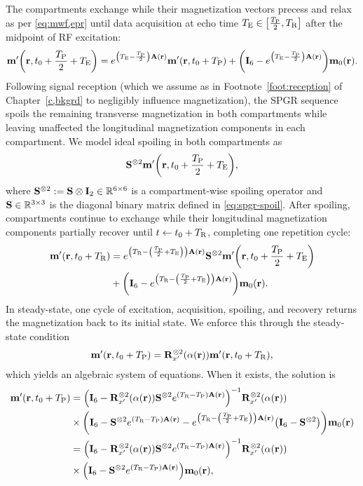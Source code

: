The compartments exchange
while their magnetization vectors precess and relax
as per \eqref{eq:mwf,epr}
until data acquisition
at echo time $\TE \in \brac{\frac{\TP}{2},\TR}$
after the midpoint of RF excitation:
\begin{align}
	\bmmp\paren{\bmr,t_0+\frac{\TP}{2}+\TE} =
		e^{\paren{\TE-\frac{\TP}{2}}\bmA\pr} \bmmp\paren{\bmr,t_0+\TP} 
		+ \paren{\eye{6} - e^{\paren{\TE-\frac{\TP}{2}}\bmA\pr}} \bmmzero\pr.
	\label{eq:mwf,spgr-daq}
\end{align}
Following signal reception
(which we assume 
as in Footnote~\ref{foot:reception} 
of Chapter~\ref{c,bkgrd}
to negligibly influence magnetization),
the SPGR sequence spoils
the remaining transverse magnetization
in both compartments
while leaving unaffected 
the longitudinal magnetization components
in each compartment.
We model ideal spoiling 
in both compartments as 
\begin{align}
	\bmSsix \bmmp\paren{\bmr,t_0+\frac{\TP}{2}+\TE},
	\label{eq:mwf,spgr-spoil}
\end{align}
where $\mathbf{S}^{\otimes2} := \mathbf{S} \otimes \mathbf{I}_{2} \in \mathbb{R}^{6 \times 6}$
is a compartment-wise spoiling operator
and $\mathbf{S} \in \mathbb{R}^{3 \times 3}$
is the diagonal binary matrix 
defined in \eqref{eq:spgr-spoil}.
After spoiling,
compartments continue to exchange
while their longitudinal magnetization components
partially recover
until $t \gets t_0 + T_\mathrm{R}$,
completing one repetition cycle:
\begin{align}
	\bmmp\paren{\bmr,t_0+\TR} &=
		e^{\paren{\TR-\paren{\frac{\TP}{2}+\TE}}\bmA\pr} \bmSsix 
		\bmmp\paren{\bmr,t_0+\frac{\TP}{2}+\TE} 
		\nonumber \\
		&+ \paren{\eye{6} - e^{\paren{\TR-\paren{\frac{\TP}{2}+\TE}}\bmA\pr}} \bmmzero\pr.
	\label{eq:mwf,spgr-epr}
\end{align}
In steady-state, one cycle of excitation, acquisition, spoiling, and recovery 
returns the magnetization back to its initial state.
We enforce this through the steady-state condition
\begin{align}
	\bmmp\paren{\bmr,t_0+\TP} = 
		\bmRxpsix{\flip\pr} \bmmp\paren{\bmr,t_0+\TR},
		\label{eq:mwf,spgr-ss}
\end{align}
which yields an algebraic system
of equations.
When it exists,
the solution is
\begin{align}
	\bmmp\paren{\bmr,t_0+\TP} &=
		\inv{\eye{6}-\bmRxpsix{\flip\pr} \bmSsix e^{\paren{\TR-\TP}\bmA\pr}} \bmRxpsix{\flip\pr}
		\label{eq:mwf,spgr-m-t0-alg} \\
	&\times \paren{\eye{6}-\bmSsix e^{\paren{\TR-\TP}\bmA\pr} -
		e^{\paren{\TR-\paren{\frac{\TP}{2}+\TE}}\bmA\pr}\paren{\eye{6}-\bmSsix}}
		\bmmzero\pr
		\nonumber \\
	&= \inv{\eye{6}-\bmRxpsix{\flip\pr} \bmSsix e^{\paren{\TR-\TP}\bmA\pr}} \bmRxpsix{\flip\pr}
		\label{eq:mwf,spgr-m-t0} \\
	&\times \paren{\eye{6}-\bmSsix e^{\paren{\TR-\TP}\bmA\pr}} \bmmzero\pr,
		\nonumber 
\end{align}
